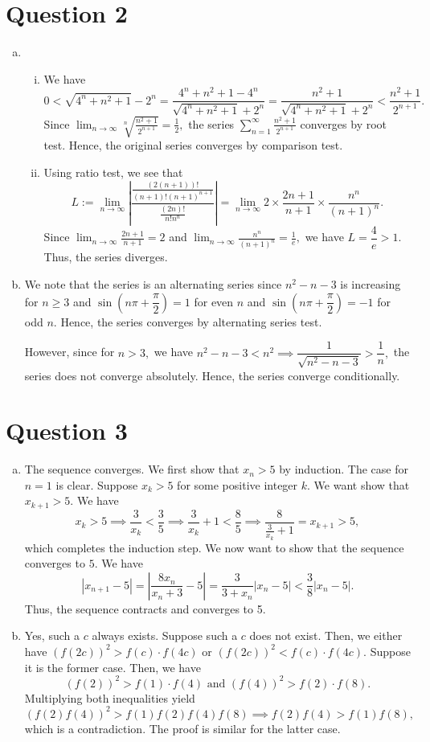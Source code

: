 \documentclass{article}
\begin{document}
\section*{Question 2}
\begin{enumerate}[(a)]
    \item \begin{enumerate}[(i)]
        \item We have $$0<\sqrt{4^n+n^2+1}-2^n=\frac{4^n+n^2+1-4^n}{\sqrt{4^n+n^2+1}+2^n}=\frac{n^2+1}{\sqrt{4^n+n^2+1}+2^n}<\frac{n^2+1}{2^{n+1}}.$$
        Since $\displaystyle\lim_{n\to\infty}\sqrt[n]{\frac{n^2+1}{2^{n+1}}}=\frac{1}{2},$ the series $\displaystyle\sum^{\infty}_{n=1}\frac{n^2+1}{2^{n+1}}$ converges by root test. Hence, the original series converges by comparison test.
        \item Using ratio test, we see that $$L:=\lim_{n\to\infty}\left|\frac{\frac{(2(n+1))!}{(n+1)!(n+1)^{n+1}}}{\frac{(2n)!}{n!n^n}}\right|=\lim_{n\to\infty}2\times\frac{2n+1}{n+1}\times\frac{n^n}{(n+1)^n}.$$
        Since $\displaystyle\lim_{n\to\infty}\frac{2n+1}{n+1}=2$ and $\displaystyle\lim_{n\to\infty}\frac{n^n}{(n+1)^n}=\frac{1}{e},$ we have $L=\dfrac{4}{e}>1.$ Thus, the series diverges.
    \end{enumerate}
    \item We note that the series is an alternating series since $n^2-n-3$ is increasing for $n\geq3$ and $\sin\left(n\pi+\dfrac{\pi}{2}\right)=1$ for even $n$ and $\sin\left(n\pi+\dfrac{\pi}{2}\right)=-1$ for odd $n.$ Hence, the series converges by alternating series test.
    
    However, since for $n>3,$ we have $n^2-n-3<n^2\implies \dfrac{1}{\sqrt{n^2-n-3}}>\dfrac{1}{n},$ the series does not converge absolutely. Hence, the series converge conditionally.
\end{enumerate}

\section*{Question 3}
\begin{enumerate}[(a)]
    \item The sequence converges. We first show that $x_n>5$ by induction. The case for $n=1$ is clear. Suppose $x_k>5$ for some positive integer $k.$ We want show that $x_{k+1}>5.$ We have $$x_k>5\implies \frac{3}{x_k}<\frac{3}{5}\implies \frac{3}{x_k}+1<\frac{8}{5}\implies\frac{8}{\frac{3}{x_k}+1}=x_{k+1}>5,$$ which completes the induction step. We now want to show that the sequence converges to $5.$ We have $$|x_{n+1}-5|=\left|\frac{8x_n}{x_n+3}-5\right|=\frac{3}{3+x_n}\left|x_n-5\right|<\frac{3}{8}|x_n-5|.$$ Thus, the sequence contracts and converges to 5.
    \item Yes, such a $c$ always exists. Suppose such a $c$ does not exist. Then, we either have $(f(2c))^2>f(c)\cdot f(4c)$ or $(f(2c))^2<f(c)\cdot f(4c).$ Suppose it is the former case. Then, we have $$(f(2))^2>f(1)\cdot f(4) \text{ and }(f(4))^2>f(2)\cdot f(8).$$Multiplying both inequalities yield $$(f(2)f(4))^2>f(1)f(2)f(4)f(8)\implies f(2)f(4)>f(1)f(8),$$ which is a contradiction. The proof is similar for the latter case.
\end{enumerate}
\end{document}
